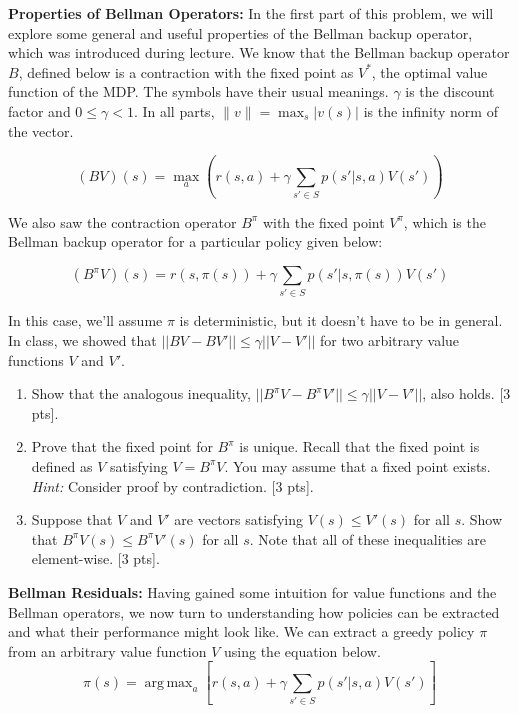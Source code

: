 \documentclass[11pt]{article}
\DeclareMathOperator*{\argmax}{arg\,max}
\begin{document}
\noindent \textbf{Properties of Bellman Operators:} In the first part of this problem, we will explore some general and useful properties of the Bellman backup operator, which was introduced during lecture. We know that the Bellman backup operator $B$, defined below is a contraction with the fixed point as $V^*$, the optimal value function of the MDP. The symbols have their usual meanings. $\gamma$ is the discount factor and $0 \leq \gamma < 1$. In all parts, $\|v\| = \max_{s} | v(s) |$ is the infinity norm of the vector.

\begin{equation}
    (BV)(s) = \max_a \left( r(s, a) + \gamma\sum_{s' \in S}p(s'|s,a)V(s') \right)
\end{equation}

\noindent We also saw the contraction operator $B^\pi$ with the fixed point $V^\pi$, which is the Bellman backup operator for a particular policy given below:

\begin{equation}
    (B^\pi V)(s) = r(s,\pi(s)) + \gamma\sum_{s' \in S}p(s'|s,\pi(s))V(s')
\end{equation}


\noindent In this case, we'll assume $\pi$ is deterministic, but it doesn't have to be in general. In class, we showed that $|| BV - BV' || \leq \gamma ||V - V'||$ for two arbitrary value functions $V$ and $V'$. 

\begin{enumerate}[label=(\alph*)]
    \item Show that the analogous inequality, $|| B^\pi V - B^\pi V' || \leq \gamma ||V - V'||$, also holds. [3 pts].
    \newpage
    \item Prove that the fixed point for $B^\pi$ is unique. Recall that the fixed point is defined as $V$ satisfying $V = B^\pi V$. You may assume that a fixed point exists. \textit{Hint:} Consider proof by contradiction. [3 pts].
    \newpage
    \item Suppose that $V$ and $V'$ are vectors satisfying $V(s) \leq V'(s)$ for all $s$. Show that $B^\pi V(s) \leq B^\pi V'(s)$ for all $s$. Note that all of these inequalities are element-wise. [3 pts].
    \newpage
\end{enumerate}


\noindent \textbf{Bellman Residuals:} Having gained some intuition for value functions and the Bellman operators, we now turn to understanding how policies can be extracted and what their performance might look like. We can extract a greedy policy $\pi$ from an arbitrary value function $V$ using the equation below. 
\begin{equation}
    \pi(s) = \argmax_{a} [{r(s,a) + \gamma\sum_{s' \in S}p(s'|s,a)V(s')}]
\end{equation}
\end{document}
